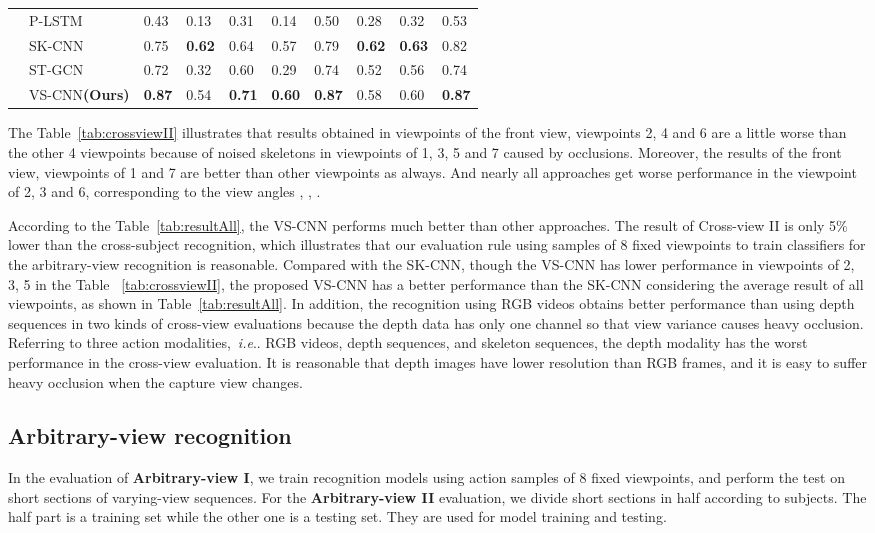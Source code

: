 \documentclass[journal]{IEEEtran}
\makeatletter
\DeclareRobustCommand\onedot{\futurelet\@let@token\@onedot}
\def\@onedot{\ifx\@let@token.\else.\null\fi\xspace}
\def\ie{\emph{i.e}\onedot} \def\Ie{\emph{I.e}\onedot}
\makeatother
\begin{document}
\begin{table*}[!t]
\begin{center}
\begin{tabular}{|p{1cm}|p{2.3cm}|p{1cm}|p{1cm}|p{1cm}|p{1cm}|p{1cm}|p{1cm}|p{1cm}|p{1cm}|}
 & P-LSTM~\cite{ShahroudyNTU2016} & 0.43 & 0.13 & 0.31 & 0.14 & 0.50  & 0.28  & 0.32  & 0.53   \\
 & SK-CNN~\cite{EnhancedSK2017} & 0.75 & \textbf{0.62} & 0.64 & 0.57 & 0.79  & \textbf{0.62}  & \textbf{0.63}  & 0.82  \\
 & ST-GCN~\cite{STGCN2018} & 0.72 & 0.32 & 0.60 & 0.29 & 0.74 & 0.52  & 0.56  & 0.74  \\
 & VS-CNN\textbf{(Ours)} & \textbf{0.87}  & 0.54  & \textbf{0.71}  & \textbf{0.60} & \textbf{0.87} & 0.58 & 0.60 & \textbf{0.87} \\
\hline
\end{tabular}
\end{center}
\end{table*}

The Table~\ref{tab:crossviewII} illustrates that results obtained in viewpoints of the front view, viewpoints 2, 4 and 6 are a little worse than the other 4 viewpoints because of noised skeletons in viewpoints of 1, 3, 5 and 7 caused by occlusions. Moreover, the results of the front view, viewpoints of 1 and 7 are better than other viewpoints as always. And nearly all approaches get worse performance in the viewpoint of 2, 3 and 6, corresponding to the view angles , , .

According to the Table~\ref{tab:resultAll}, the VS-CNN performs much better than other approaches. The result of Cross-view II is only 5\% lower than the cross-subject recognition, which illustrates that our evaluation rule using samples of 8 fixed viewpoints to train classifiers for the arbitrary-view recognition is reasonable. Compared with the SK-CNN, though the VS-CNN has lower performance in viewpoints of 2, 3, 5 in the Table ~\ref{tab:crossviewII}, the proposed VS-CNN has a better performance than the SK-CNN considering the average result of all viewpoints, as shown in Table~\ref{tab:resultAll}. In addition, the recognition using RGB videos obtains better performance than using depth sequences in two kinds of cross-view evaluations because the depth data has only one channel so that view variance causes heavy occlusion. Referring to three action modalities,~\ie RGB videos, depth sequences, and skeleton sequences, the depth modality has the worst performance in the cross-view evaluation. It is reasonable that depth images have lower resolution than RGB frames, and it is easy to suffer heavy occlusion when the capture view changes.
\subsection{Arbitrary-view recognition}
In the evaluation of \textbf{Arbitrary-view I}, we train recognition models using action samples of 8 fixed viewpoints, and perform the test on short sections of varying-view sequences. For the \textbf{Arbitrary-view II} evaluation, we divide short sections in half according to subjects.  The half part is a training set while the other one is a testing set. They are used for model training and testing.
\end{document}
